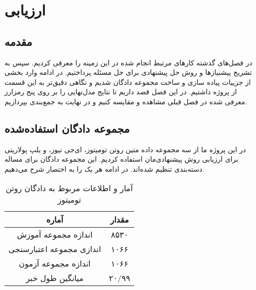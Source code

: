 \chapter{ارزیابی}
\section{مقدمه}
در فصل‌های گذشته کارهای مرتبط انجام شده در این زمینه را معرفی کردیم. سپس به تشریح پیشنیاز‌ها و روش حل پیشنهادی برای حل مسئله پرداختیم. در ادامه وارد بخشی از جزییات پیاده سازی و ساخت مجموعه دادگان شدیم و نگاهی دقیق‌تر به این قسمت از پروژه داشتیم. در این فصل قصد داریم تا نتایج مدل‌نهایی را بر روی پنج رمزارز معرفی شده در فصل قبلی مشاهده و مقایسه کنیم و در نهایت به جمع‌بندی بپردازیم.

\section{مجموعه دادگان استفاده‌شده}
در این پروژه ما از سه مجموعه داده متین روتن تومیتوز، ای‌جی نیوز، و یلپ پولاریتی برای ارزیابی روش پیشنهادی‌مان استفاده کردیم. این مجموعه دادگان برای مساله دسته‌بندی تنظیم شده‌اند. در ادامه هر یک را به اختصار شرح می‌دهیم.

\begin{table}[!h]
	\caption{آمار و اطلاعات مربوط به دادگان روتن تومیتوز}
	\label{tomatoDataset}
	\begin{center}
		\begin{tabular}{|c|c|}
			\hline
			\textbf{آماره} & \textbf{مقدار} \\
			\hline
			\hline
			اندازه مجموعه آموزش
			&   ۸۵۳۰  \\
			\hline
			اندازی مجموعه اعتبارسنجی
			& ۱۰۶۶  \\
			\hline
			اندازه مجموعه آزمون
			& ۱۰۶۶ \\
			\hline
			میانگین طول خبر
			& ۲۰/۹۹  \\
			\hline
			
		\end{tabular}
	\end{center}
\end{table}

